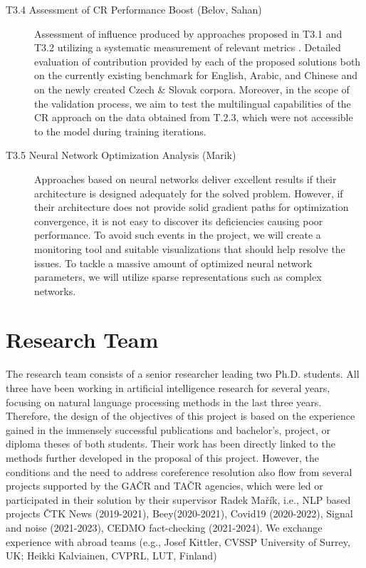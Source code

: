 \begin{description}
	\item  [T3.4 Assessment of CR Performance Boost (Belov, Sahan)]  Assessment of influence produced by approaches proposed in T3.1 and T3.2 utilizing a systematic measurement of relevant metrics \cite{muc-Vilain1995,b3-Bagga1998,ceaf-Luo2005}. Detailed evaluation of contribution provided by each of the proposed solutions both on the currently existing benchmark for English, Arabic, and Chinese \cite{ontonotes5-Weischedel2013} and on the newly created Czech \& Slovak corpora. Moreover, in the scope of the validation process, we aim to test the multilingual capabilities of the CR approach on the data obtained from T.2.3, which were not accessible to the model during training iterations.
	
	\item [T3.5 Neural Network Optimization Analysis  (Marik)] Approaches based on neural networks deliver excellent results if their architecture is designed adequately for the solved problem. However, if their architecture does not provide solid gradient paths for optimization convergence, it is not easy to discover its deficiencies causing poor performance. To avoid such events in the project, we will create a monitoring tool and suitable visualizations that should help resolve the issues. To tackle a massive amount of optimized neural network parameters, we will utilize sparse representations such as complex networks.

\end{description}


\section{Research Team}\label{sec:research_team}

The research team consists of a senior researcher leading two Ph.D. students. All three have been working in artificial intelligence research for several years, focusing on natural language processing methods in the last three years. Therefore, the design of the objectives of this project is based on the experience gained in the immensely successful publications and bachelor's, project, or diploma theses of both students. Their work has been directly linked to the methods further developed in the proposal of this project. However, the conditions and the need to address coreference resolution also flow from several projects supported by the GAČR and TAČR agencies, which were led or participated in their solution by their supervisor Radek Mařík, i.e., NLP based projects ČTK News (2019-2021), Beey(2020-2021), Covid19 (2020-2022), Signal and noise (2021-2023), CEDMO fact-checking (2021-2024). We exchange experience with abroad teams (e.g., Josef Kittler, CVSSP University of Surrey, UK; Heikki Kalviainen, CVPRL, LUT, Finland)


